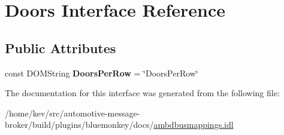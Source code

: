 \hypertarget{interfaceDoors}{\section{Doors Interface Reference}
\label{interfaceDoors}
}
\subsection*{Public Attributes}
\begin{DoxyCompactItemize}
\item 
\hypertarget{interfaceDoors_a934757a9ea6392a3e5937e2d46497f4c}{const D\+O\+M\+String {\bfseries Doors\+Per\+Row} = \char`\"{}Doors\+Per\+Row\char`\"{}}\label{interfaceDoors_a934757a9ea6392a3e5937e2d46497f4c}

\end{DoxyCompactItemize}


The documentation for this interface was generated from the following file\+:\begin{DoxyCompactItemize}
\item 
/home/kev/src/automotive-\/message-\/broker/build/plugins/bluemonkey/docs/\hyperlink{ambdbusmappings_8idl}{ambdbusmappings.\+idl}\end{DoxyCompactItemize}

